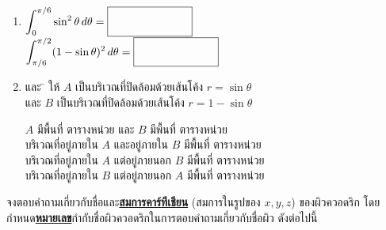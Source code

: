 \documentclass[12pt,final]{novelette} %
\begin{document}
\begin{question}
\begin{question}
\begin{enumerate}[label=(\alph*),topsep=1.5em,itemsep=3em]
            \item $\displaystyle \int_0^{\pi/6} \sin^2 \theta \, d \theta = \ansbox$ \\[1em]
                  $\displaystyle \int_{\pi/6}^{\pi/2} (1 - \sin \theta)^2 \, d \theta = \ansbox$


            \item {}
                  \begin{tabbing}
                      และ \=\kill
                      ให้  \> $A$ เป็นบริเวณที่ปิดล้อมด้วยเส้นโค้ง $r = \sin \theta$ \\[.5em]
                      และ \> $B$ เป็นบริเวณที่ปิดล้อมด้วยเส้นโค้ง $r = 1 - \sin \theta$ \\
                  \end{tabbing}
                  \medskip
                  $A$ มีพื้นที่ \ansbox ตารางหน่วย และ $B$ มีพื้นที่ \ansbox ตารางหน่วย \\[1em]
                  บริเวณที่อยู่ภายใน $A$ และอยู่ภายใน $B$ มีพื้นที่ \ansboxl ตารางหน่วย \\[1em]
                  บริเวณที่อยู่ภายใน $A$ แต่อยู่ภายนอก $B$ มีพื้นที่ \ansboxl ตารางหน่วย \\[1em]
                  บริเวณที่อยู่ภายใน $B$ แต่อยู่ภายนอก $A$ มีพื้นที่ \ansboxl ตารางหน่วย
        \end{enumerate}
    \end{question}

    \clearpage

    \item {}
     จงตอบคำถามเกี่ยวกับชื่อและ\uline{\bf สมการคาร์ทีเชียน} (สมการในรูปของ $x, y, z$) ของผิวควอดริก
    โดยกำหนด\uline{\bf หมายเลข}กำกับชื่อผิวควอดริกในการตอบคำถามเกี่ยวกับชื่อผิว ดังต่อไปนี้


\end{question}
\end{document}
